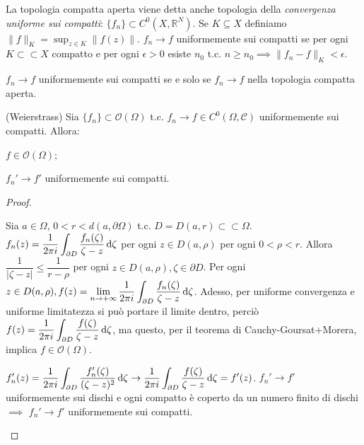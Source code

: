 La topologia compatta aperta viene detta anche topologia della \textit{convergenza uniforme sui compatti}: $\{f_n\} \subset C^0(X, \mathbb{R}^N)$. Se $K \subseteq X$ definiamo $\displaystyle \|f\|_K=\sup_{z \in K} \|f(z)\|$.
$f_n \rightarrow f$ uniformemente sui compatti se per ogni $K \subset \subset X$ compatto e per ogni $\epsilon>0$ esiste $n_0$ t.c. $n \ge n_0 \implies \|f_n-f\|_K<\epsilon$.

\begin{exc}
  $f_n \rightarrow f$ uniformemente sui compatti se e solo se $f_n \rightarrow f$ nella topologia compatta aperta.
\end{exc}

\begin{thm}
  (Weierstrass) Sia $\{f_n\} \subset \mathcal{O}(\Omega)$ t.c. $f_n \rightarrow f \in C^0(\Omega, \mathcal{C})$ uniformemente sui compatti. Allora:
  \begin{nlist}
    \item $f \in \mathcal{O}(\Omega)$;
    \item $f_n' \rightarrow f'$ uniformemente sui compatti.
  \end{nlist}
\end{thm}

\begin{proof}
  \begin{nlist}
    \item Sia $a \in \Omega$, $0<r<d(a, \partial\Omega)$ t.c. $D=D(a, r) \subset \subset \Omega$. $\displaystyle f_n(z)=\frac{1}{2\pi i} \int_{\partial D} \frac{f_n(\zeta)}{\zeta-z} \mathop{}\!\mathrm{d} \zeta$ per ogni $z \in D(a, \rho)$ per ogni $0<\rho<r$.
    Allora $\dfrac{1}{|\zeta-z|} \le \dfrac{1}{r-\rho}$ per ogni $z \in D(a, \rho), \zeta \in \partial{D}$.
    Per ogni $\displaystyle z \in D(a, \rho), f(z)=\lim_{n \rightarrow +\infty} \frac{1}{2\pi i} \int_{\partial D} \frac{f_n(\zeta)}{\zeta-z} \mathop{}\!\mathrm{d} \zeta$.
    Adesso, per uniforme convergenza e uniforme limitatezza si può portare il limite dentro, perciò $\displaystyle f(z)=\frac{1}{2\pi i}\int_{\partial D} \frac{f(\zeta)}{\zeta-z} \mathop{}\!\mathrm{d} \zeta$, ma questo, per il teorema di Cauchy-Goursat+Morera, implica $f \in \mathcal{O}(\Omega)$.
    \item $\displaystyle f_n'(z)=\frac{1}{2\pi i} \int_{\partial D} \frac{f_n'(\zeta)}{(\zeta-z)^2}\mathop{}\!\mathrm{d}\zeta \rightarrow \frac{1}{2\pi i} \int_{\partial D} \frac{f(\zeta)}{\zeta-z} \mathop{}\!\mathrm{d}\zeta=f'(z)$.
    $f_n' \rightarrow f'$ uniformemente sui dischi e ogni compatto è coperto da un numero finito di dischi $\implies$ $f_n' \rightarrow f'$ uniformemente sui compatti.
  \end{nlist}
\end{proof}

